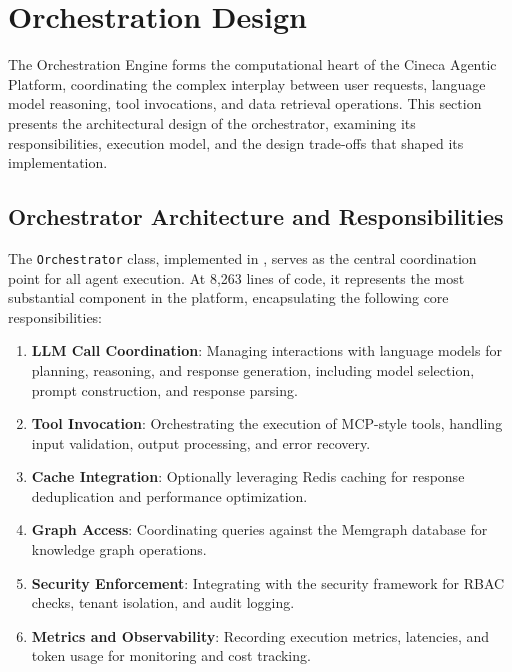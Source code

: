 \documentclass[a4paper,twoside]{sapthesis}
\begin{document}
\section{Orchestration Design}
\label{sec:orchestration-design}

The Orchestration Engine forms the computational heart of the Cineca Agentic Platform, coordinating the complex interplay between user requests, language model reasoning, tool invocations, and data retrieval operations. This section presents the architectural design of the orchestrator, examining its responsibilities, execution model, and the design trade-offs that shaped its implementation.

\subsection{Orchestrator Architecture and Responsibilities}

The \texttt{Orchestrator} class, implemented in , serves as the central coordination point for all agent execution. At 8,263 lines of code, it represents the most substantial component in the platform, encapsulating the following core responsibilities:

\begin{enumerate}
    \item \textbf{LLM Call Coordination}: Managing interactions with language models for planning, reasoning, and response generation, including model selection, prompt construction, and response parsing.
    
    \item \textbf{Tool Invocation}: Orchestrating the execution of MCP-style tools, handling input validation, output processing, and error recovery.
    
    \item \textbf{Cache Integration}: Optionally leveraging Redis caching for response deduplication and performance optimization.
    
    \item \textbf{Graph Access}: Coordinating queries against the Memgraph database for knowledge graph operations.
    
    \item \textbf{Security Enforcement}: Integrating with the security framework for RBAC checks, tenant isolation, and audit logging.
    
    \item \textbf{Metrics and Observability}: Recording execution metrics, latencies, and token usage for monitoring and cost tracking.
\end{enumerate}
\end{document}
